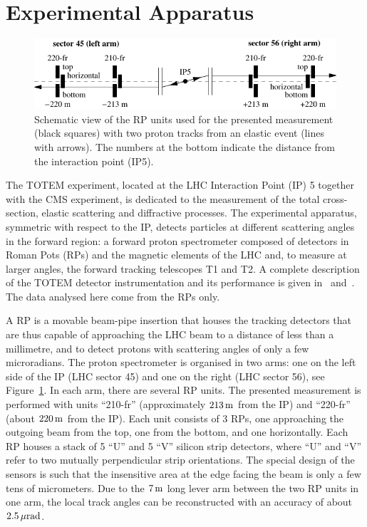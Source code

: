 \section{Experimental Apparatus}
\label{sec:exp apparatus}

\begin{figure}
\begin{center}
\includegraphics{fig/elastic_principle.pdf}
\caption{%
Schematic view of the RP units used for the presented measurement (black squares) with two proton tracks from an elastic event (lines with arrows). The numbers at the bottom indicate the distance from the interaction point (IP5).
}
\label{fig:rpsketch}
\end{center}
\end{figure}

The TOTEM experiment, located at the LHC Interaction Point (IP) 5 together with the CMS experiment, is dedicated to the measurement of the total cross-section, elastic scattering and diffractive processes. The experimental apparatus, symmetric with respect to the IP, detects particles at different scattering angles in the forward region: a forward proton spectrometer composed of detectors in Roman Pots (RPs) and the magnetic elements of the LHC and, to measure at larger angles, the forward tracking telescopes T1 and T2. A complete description of the TOTEM detector instrumentation and its performance is given in~\cite{totem-jinst} and~\cite{totem-ijmp}. The data analysed here come from the RPs only. 

A RP is a movable beam-pipe insertion that houses the tracking detectors that are thus capable of approaching the LHC beam to a distance of less than a millimetre, and to detect protons with scattering angles of only a few microradians. The proton spectrometer is organised in two arms: one on the left side of the IP (LHC sector 45) and one on the right (LHC sector 56), see Figure~\ref{fig:rpsketch}. In each arm, there are several RP units. The presented measurement is performed with units ``210-fr'' (approximately $213\,{\rm m}$ from the IP) and ``220-fr'' (about $220\,{\rm m}$ from the IP). Each unit consists of 3 RPs, one approaching the outgoing beam from the top, one from the bottom, and one horizontally. Each RP houses a stack of 5 ``U'' and 5 ``V'' silicon strip detectors, where ``U'' and ``V'' refer to two mutually perpendicular strip orientations. The special design of the sensors is such that the insensitive area at the edge facing the beam is only a few tens of micrometers. Due to the $7\,{\rm m}$ long lever arm between the two RP units in one arm, the local track angles can be reconstructed with an accuracy  of about $2.5\,{\rm \mu rad}$.

